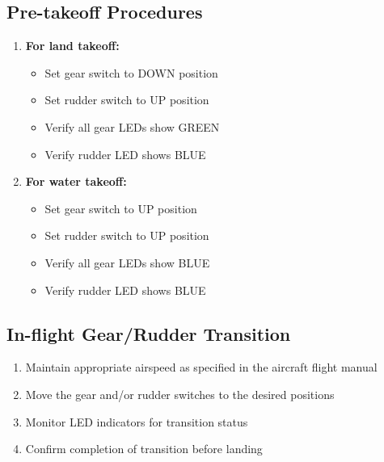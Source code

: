 \documentclass[12pt,a4paper,twoside,openright]{book}
\begin{document}
\subsection{Pre-takeoff Procedures}
\begin{enumerate}
    \item \textbf{For land takeoff:}
    \begin{itemize}
        \item Set gear switch to DOWN position
        \item Set rudder switch to UP position
        \item Verify all gear LEDs show GREEN
        \item Verify rudder LED shows BLUE
    \end{itemize}
    \item \textbf{For water takeoff:}
    \begin{itemize}
        \item Set gear switch to UP position
        \item Set rudder switch to UP position
        \item Verify all gear LEDs show BLUE
        \item Verify rudder LED shows BLUE
    \end{itemize}
\end{enumerate}

\subsection{In-flight Gear/Rudder Transition}
\begin{enumerate}
    \item Maintain appropriate airspeed as specified in the aircraft flight manual
    \item Move the gear and/or rudder switches to the desired positions
    \item Monitor LED indicators for transition status
    \item Confirm completion of transition before landing
\end{enumerate}
\end{document}
